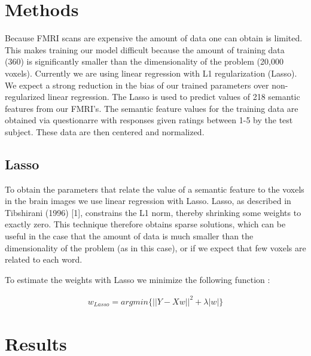\documentclass{article} %
\begin{document}
\section{Methods}
Because FMRI scans are expensive the amount of data one can obtain is limited. This makes training our model difficult because the amount of training data (360) is significantly smaller than the dimensionality of the problem (20,000 voxels). Currently we are using linear regression with L1 regularization (Lasso). We expect a strong reduction in the bias of our trained parameters over non-regularized linear regression. The Lasso is used to predict values of 218 semantic features from our FMRI's. The semantic feature values for the training data are obtained via questionarre with responses given ratings between 1-5 by the test subject. These data are then centered and normalized.



\subsection{Lasso}

To obtain the parameters that relate the value of a semantic feature to the voxels in the brain images we use linear regression with Lasso. Lasso, as described in Tibshirani (1996) [1], constrains the L1 norm, thereby shrinking some weights to exactly zero. This technique therefore obtains sparse solutions, which can be useful in the case that the amount of data is much smaller than the dimensionality of the problem (as in this case), or if we expect that few voxels are related to each word. 

To estimate the weights with Lasso we minimize the following function :

\begin{align*}
w_{Lasso} = argmin \{|| Y - Xw ||^2 + \lambda|w|\}
\end{align*}



\section{Results}
\end{document}
